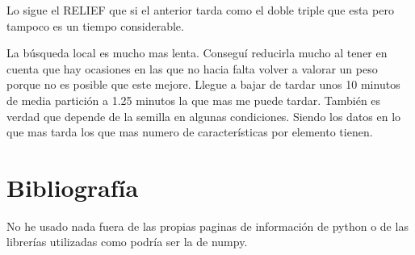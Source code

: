\documentclass[titlepage]{article}
\begin{document}
	Lo sigue el RELIEF que si el anterior tarda como el doble triple que esta pero tampoco es un tiempo considerable.
	
	La búsqueda local es mucho mas lenta. Conseguí reducirla mucho al tener en cuenta que hay ocasiones en las que no hacia falta volver a valorar un peso porque no es posible que este mejore. Llegue a bajar de tardar unos 10 minutos de media partición a 1.25 minutos la que mas me puede tardar. También es verdad que depende de la semilla en algunas condiciones. Siendo los datos en lo que mas tarda los que mas numero de características por elemento tienen.
	
	

	\section{Bibliografía}
	No he usado nada fuera de las propias paginas de información de python o de las librerías utilizadas como podría ser la de numpy.

  
\end{document}
